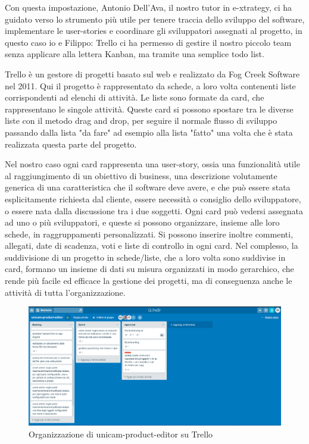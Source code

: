Con questa impostazione, Antonio Dell'Ava, il nostro tutor in e-xtrategy, ci ha guidato verso lo strumento più utile per tenere traccia dello sviluppo del software, implementare le user-stories e coordinare gli sviluppatori assegnati al progetto, in questo caso io e Filippo: Trello ci ha permesso di gestire il nostro piccolo team senza applicare alla lettera Kanban, ma tramite una semplice todo list.

Trello\cite{trello} è un gestore di progetti basato sul web e realizzato da Fog Creek Software nel 2011.
Qui il progetto è rappresentato da schede, a loro volta contenenti liste corrispondenti ad elenchi di attività. Le liste sono formate da card, che rappresentano le singole attività.
Queste card si possono spostare tra le diverse liste con il metodo drag and drop, per seguire il normale flusso di sviluppo passando dalla lista "da fare" ad esempio alla lista "fatto" una volta che è stata realizzata questa parte del progetto.

Nel nostro caso ogni card rappresenta una user-story, ossia una funzionalità utile al raggiungimento di un obiettivo di business, una descrizione volutamente generica di una caratteristica che il software deve avere, e che può essere stata esplicitamente richiesta dal cliente, essere necessità o consiglio dello sviluppatore, o essere nata dalla discussione tra i due soggetti.
Ogni card può vedersi assegnata ad uno o più sviluppatori, e queste si possono organizzare, insieme alle loro schede, in raggruppamenti personalizzati.
Si possono inserire inoltre commenti, allegati, date di scadenza, voti e liste di controllo in ogni card.
Nel complesso, la suddivisione di un progetto in schede/liste, che a loro volta sono suddivise in card, formano un insieme di dati su misura organizzati in modo gerarchico, che rende più facile ed efficace la gestione dei progetti, ma di conseguenza anche le attività di tutta l'organizzazione.

\begin{figure}[h]
	\centering
	\includegraphics[scale=0.35]{Immagini/trello_start.png} 
	\caption{Organizzazione di unicam-product-editor su Trello}
\end{figure}

